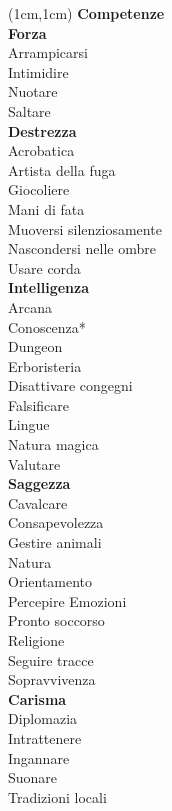 \documentclass[a4paper,12 pt,openany]{book}
\begin{document}
	\begin{textblock*}{4cm}(1cm,1cm) %
		{\textbf{Competenze}\\
			\footnotesize 
			\textbf{Forza}\\
			Arrampicarsi\\
			Intimidire\\
			Nuotare\\
			Saltare	\\
			\textbf{Destrezza}\\
			Acrobatica\\
			Artista della fuga\\
			Giocoliere\\
			Mani di fata\\
			Muoversi silenziosamente\\
			Nascondersi nelle ombre\\
			Usare corda	\\
			\textbf{Intelligenza}\\
			Arcana\\
			Conoscenza*\\
			Dungeon\\
			Erboristeria\\
			Disattivare congegni\\
			Falsificare\\
			Lingue\\
			Natura magica\\
			Valutare\\
			\textbf{Saggezza}\\
			Cavalcare\\
			Consapevolezza\\
			Gestire animali\\
			Natura\\
			Orientamento\\
			Percepire Emozioni\\
			Pronto soccorso\\
			Religione\\
			Seguire tracce\\
			Sopravvivenza\\
			\textbf{Carisma}\\
			Diplomazia\\
			Intrattenere\\
			Ingannare\\
			Suonare\\
			Tradizioni locali
		}
	
		\end{textblock*}	
\end{document}
